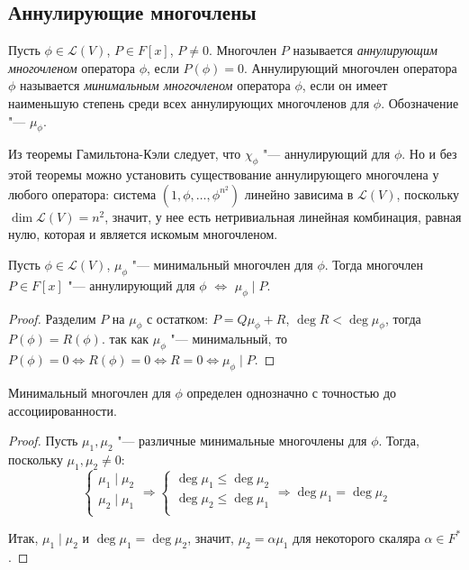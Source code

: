 \subsection{Аннулирующие многочлены}

\begin{definition}
	Пусть $\phi \in \mathcal{L}(V)$, $P \in F[x]$, $P \ne 0$. Многочлен $P$ называется \textit{аннулирующим многочленом} оператора $\phi$, если $P(\phi) = 0$. Аннулирующий многочлен оператора $\phi$ называется \textit{минимальным многочленом} оператора $\phi$, если он имеет наименьшую степень среди всех аннулирующих многочленов для $\phi$. Обозначение "--- $\mu_\phi$.
\end{definition}

\begin{note}
	Из теоремы Гамильтона-Кэли следует, что $\chi_\phi$ "--- аннулирующий для $\phi$. Но и без этой теоремы можно установить существование аннулирующего многочлена у любого оператора: система $(1, \phi, \dots, \phi^{n^2})$ линейно зависима в $\mathcal{L}(V)$, поскольку $\dim{\mathcal{L}(V)} = n^2$, значит, у нее есть нетривиальная линейная комбинация, равная нулю, которая и является искомым многочленом.
\end{note}

\begin{proposition}
	Пусть $\phi \in \mathcal{L}(V)$, $\mu_\phi$ "--- минимальный многочлен для $\phi$. Тогда многочлен $P \in F[x]$ "--- аннулирующий для $\phi$ $\Leftrightarrow$ $\mu_\phi\mid P$.
\end{proposition}

\begin{proof}
	Разделим $P$ на $\mu_\phi$ с остатком: $P = Q\mu_\phi + R$, $\deg{R} < \deg{\mu_\phi}$, тогда $P(\phi) = R(\phi)$. так как $\mu_\phi$ "--- минимальный, то $P(\phi) = 0 \Leftrightarrow R(\phi) = 0 \Leftrightarrow R = 0 \Leftrightarrow \mu_\phi\mid P$.
\end{proof}

\begin{corollary}
	Минимальный многочлен для $\phi$ определен однозначно с точностью до ассоциированности.
\end{corollary}

\begin{proof}
	Пусть $\mu_1, \mu_2$ "--- различные минимальные многочлены для $\phi$. Тогда, поскольку $\mu_1, \mu_2 \ne 0$:
	\[\left\{\begin{aligned}
		\mu_1\mid \mu_2\\
		\mu_2\mid \mu_1\\
	\end{aligned}\right. \Rightarrow
	\left\{\begin{aligned}
		\deg{\mu_1} \le \deg{\mu_2}\\
		\deg{\mu_2} \le \deg{\mu_1}\\
	\end{aligned}\right. \Rightarrow \deg{\mu_1} = \deg{\mu_2}\]
	
	Итак, $\mu_1\mid \mu_2$ и $\deg{\mu_1} = \deg{\mu_2}$, значит, $\mu_2 = \alpha\mu_1$ для некоторого скаляра $\alpha \in F^*$.
\end{proof}

